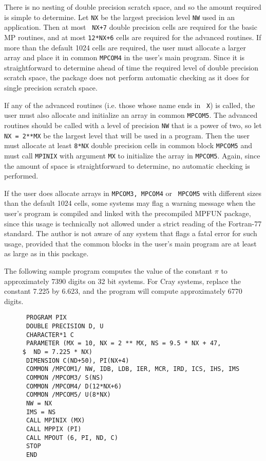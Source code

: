 There is no nesting of double precision scratch space, and so the
amount required is simple to determine.  Let {\tt NX} be the largest
precision level {\tt NW} used in an application.  Then at most {\tt
NX+7} double precision cells are required for the basic MP routines,
and at most {\tt 12*NX+6} cells are required for the advanced
routines.  If more than the default 1024 cells are required, the user
must allocate a larger array and place it in common {\tt MPCOM4} in
the user's main program.  Since it is straightforward to determine
ahead of time the required level of double precision scratch space,
the package does not perform automatic checking as it does for single
precision scratch space.

If any of the advanced routines (i.e. those whose name ends in {\tt
X}) is called, the user must also allocate and initialize an array in
common {\tt MPCOM5}.  The advanced routines should be called with a
level of precision {\tt NW} that is a power of two, so let {\tt NX =
2**MX} be the largest level that will be used in a program.  Then the
user must allocate at least {\tt 8*NX} double precision cells in
common block {\tt MPCOM5} and must call {\tt MPINIX} with argument
{\tt MX} to initialize the array in {\tt MPCOM5}.  Again, since the
amount of space is straightforward to determine, no automatic checking
is performed.

If the user does allocate arrays in {\tt MPCOM3, MPCOM4} or {\tt
MPCOM5} with different sizes than the default 1024 cells, some systems
may flag a warning message when the user's program is compiled and
linked with the precompiled MPFUN package, since this usage is
technically not allowed under a strict reading of the Fortran-77
standard.  The author is not aware of any system that flags a fatal
error for such usage, provided that the common blocks in the user's
main program are at least as large as in this package.

The following sample program computes the value of the constant $\pi$
to approximately 7390 digits on 32 bit systems.  For Cray systems,
replace the constant 7.225 by 6.623, and the program will compute
approximately 6770 digits.

\begin{tt} \begin{small} \begin{verbatim}
      PROGRAM PIX
      DOUBLE PRECISION D, U
      CHARACTER*1 C
      PARAMETER (MX = 10, NX = 2 ** MX, NS = 9.5 * NX + 47,
     $	ND = 7.225 * NX)
      DIMENSION C(ND+50), PI(NX+4)
      COMMON /MPCOM1/ NW, IDB, LDB, IER, MCR, IRD, ICS, IHS, IMS
      COMMON /MPCOM3/ S(NS)
      COMMON /MPCOM4/ D(12*NX+6)
      COMMON /MPCOM5/ U(8*NX)
      NW = NX
      IMS = NS
      CALL MPINIX (MX)
      CALL MPPIX (PI)
      CALL MPOUT (6, PI, ND, C)
      STOP
      END
\end{verbatim} \end{small} \end{tt}

